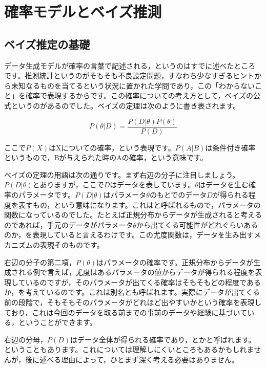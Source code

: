 \documentclass{ltjsbook}
\begin{document}
\chapter{確率モデルとベイズ推測}
\label{H13_Bayesian}


\section{ベイズ推定の基礎}

データ生成モデルが確率の言葉で記述される，というのはすでに述べたところです。推測統計というのがそもそも不良設定問題，すなわち少なすぎるヒントから未知なるものを当てるという状況に置かれた学問であり，この「わからないこと」を確率で表現するからです。この確率についての考え方として，ベイズの公式というのがあるのでした。ベイズの定理は次のように書き表されます。

$$ P(\theta|D) = \frac{P(D|\theta)P(\theta)}{P(D)} $$

ここで$P(X)$はXについての確率，という表現です。$P(A|B)$は条件付き確率というもので，Bが与えられた時のAの確率，という意味です。

ベイズの定理の用語は次の通りです。まず右辺の分子に注目しましょう。$P(D|\theta)$とありますが，ここで$D$はデータを表しています。$\theta$はデータを生む確率のパラメータです。$P(D|\theta)$はパラメータ$\theta$のもとでのデータ$D$が得られる程度を表すもの，という意味になります。これはと呼ばれるもので，パラメータの関数になっているのでした。たとえば正規分布からデータが生成されると考えるのであれば，手元のデータがパラメータ$\theta$から出てくる可能性がどれぐらいあるのか，を表現していると言えるわけです。この尤度関数は，データを生み出すメカニズムの表現そのものです。

右辺の分子の第二項，$P(\theta)$はパラメータの確率です。正規分布からデータが生成される例で言えば，尤度はあるパラメータの値からデータが得られる程度を表現しているのですが，そのパラメータが出てくる確率はそもそもどの程度であるか，を考えているのです。これは別名とも呼ばれます。実際にデータが出てくる前の段階で，そもそもそのパラメータがどれほど出やすいかという確率を表現しており，これは今回のデータを取る前までの事前のデータや経験に基づいている，ということができます。

右辺の分母，$P(D)$はデータ全体が得られる確率であり，とかと呼ばれます。ということもあります。これについては理解しにくいところもあるかもしれませんが，後に述べる理由によって，ひとまず深く考える必要はありません。
\end{document}
